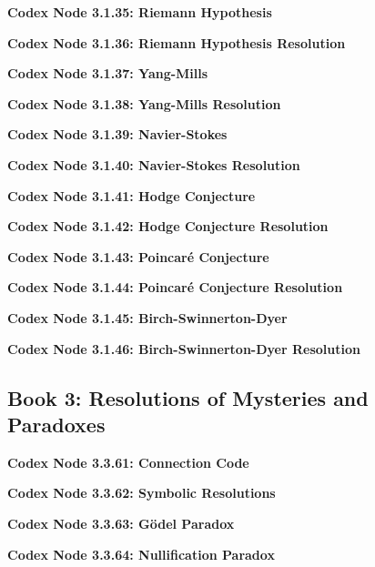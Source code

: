 \documentclass[a4paper,12pt]{book}
\newcommand{\codexnode}[5]{%
  \par\vspace{0.5em}%
  \noindent\textbf{Codex Node #1.#2.#3: #5}\label{#4}%
  \par\vspace{0.5em}%
}
\begin{document}
\codexnode{3}{1}{35}{section3/book1/codex_riemann_hypothesis}{Riemann Hypothesis}


\codexnode{3}{1}{36}{section3/book1/chapter1_riemann_hypothesis_resolution}{Riemann Hypothesis Resolution}


\codexnode{3}{1}{37}{section3/book1/codex_yang_mills}{Yang-Mills}


\codexnode{3}{1}{38}{section3/book1/chapter1_yang_mills_resolution}{Yang-Mills Resolution}


\codexnode{3}{1}{39}{section3/book1/codex_navier_stokes}{Navier-Stokes}


\codexnode{3}{1}{40}{section3/book1/chapter1_navier_stokes_resolution}{Navier-Stokes Resolution}


\codexnode{3}{1}{41}{section3/book1/codex_hodge_conjecture}{Hodge Conjecture}


\codexnode{3}{1}{42}{section3/book1/chapter1_hodge_conjecture_resolution}{Hodge Conjecture Resolution}


\codexnode{3}{1}{43}{section3/book1/codex_poincare_conjecture}{Poincaré Conjecture}


\codexnode{3}{1}{44}{section3/book1/chapter1_poincare_conjecture_resolution}{Poincaré Conjecture Resolution}


\codexnode{3}{1}{45}{section3/book1/codex_birch_swinnerton_dyer}{Birch-Swinnerton-Dyer}


\codexnode{3}{1}{46}{section3/book1/chapter1_birch_swinnerton_dyer_resolution}{Birch-Swinnerton-Dyer Resolution}


\subsection{Book 3: Resolutions of Mysteries and Paradoxes}
\codexnode{3}{3}{61}{section3/book3/chapter4_connection_code}{Connection Code}
\codexnode{3}{3}{62}{section3/book3/chapter4_symbolic_resolutions}{Symbolic Resolutions}
\codexnode{3}{3}{63}{section3/book3/chapter4_godel_paradox}{Gödel Paradox}
\codexnode{3}{3}{64}{section3/book3/codex_nullification_paradox}{Nullification Paradox}
\end{document}

